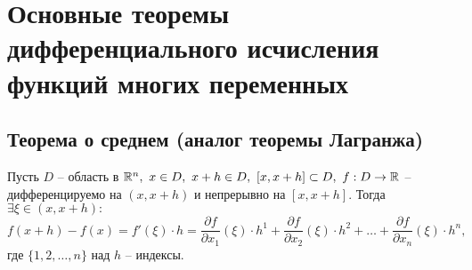 \section{Основные теоремы дифференциального исчисления функций многих переменных}

\setcounter{subsection}{4}

\subsection{Теорема о среднем (аналог теоремы Лагранжа)}

\begin{theorem}[О среднем]
    Пусть $ D $ -- область в $ \R^n, \ x \in D, \ x + h \in D, \ [x, x+h]\subset D, \ f: D \rightarrow\R $ -- дифференцируемо на $ (x,x+h) $ и непрерывно на $ [x,x+h] $. Тогда $ \exists \xi \in (x,x+h): $
    \[
        f(x+h)-f(x) = f'(\xi)\cdot h = \frac{\partial f}{\partial x_1}(\xi)\cdot h^1 + \frac{\partial f}{\partial x_2}(\xi)\cdot h^2 + \ldots + \frac{\partial f}{\partial x_n}(\xi)\cdot h^n,
    \] где $ \{1,2,\ldots,n\} $ над $ h $ -- индексы.
\end{theorem}


